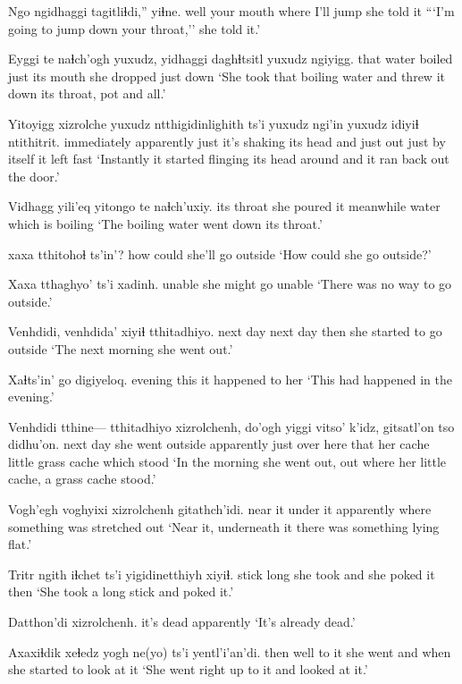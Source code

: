 \documentclass[12pt]{article}
\begin{document}
\gll Ngo ngidhaggi tagitliɬdi,'' yiɬne.
well {your mouth} {where I'll jump} {she told it}
\glt ```I'm going to jump down your throat,'' she told it.'
\glend

\gll Eyggi te naɬch'ogh yuxudz, yidhaggi daghɬtsitl yuxudz ngiyigg.
that water boiled just {its mouth} {she dropped} just down
\glt `She took that boiling water and threw it down its throat, pot and all.'
\glend

\gll Yitoyigg xizrolche yuxudz ntthigidinlighith ts'i yuxudz ngi'in yuxudz idiyiɬ ntithitrit.
immediately apparently just {it's shaking its head} and just out just {by itself} {it left fast}
\glt `Instantly it started flinging its head around and it ran back out the door.'
\glend

\gll Vidhagg yili'eq yitongo te naɬch'uxiy.
{its throat} {she poured it} meanwhile water {which is boiling}
\glt `The boiling water went down its throat.'
\glend

 xaxa tthitohoɬ ts'in'? 
how could {she'll go outside} {}
\glt `How could she go outside?'
\glend

\gll Xaxa tthaghyo' ts'i xadinh.
unable {she might go} {} unable
\glt `There was no way to go outside.'
\glend

\gll Venhdidi, venhdida' xiyiɬ tthitadhiyo.
{next day} {next day} then {she started to go outside}
\glt `The next morning she went out.'
\glend

\gll Xaɬts'in' go digiyeloq.
evening this {it happened to her}
\glt `This had happened in the evening.'
\glend

\gll Venhdidi tthine--- tthitadhiyo xizrolchenh, do'ogh yiggi vitso' k'idz, {gitsatl'on tso} didhu'on.
{next day} {} {she went outside} apparently {just over here} that {her cache} little {grass cache} {which stood}
\glt `In the morning she went out, out where her little cache, a grass cache stood.'
\glend

\gll Vogh'egh voghyixi xizrolchenh gitathch'idi.
{near it} {under it} apparently {where something was stretched out}
\glt `Near it, underneath it there was something lying flat.'
\glend

\gll Tritr ngith iɬchet ts'i yigidinetthiyh xiyiɬ. 
stick long {she took} and {she poked it} then 
\glt `She took a long stick and poked it.'
\glend

\gll Datthon'di xizrolchenh.
{it's dead} apparently
\glt `It's already dead.'
\glend

\gll Axaxiɬdik xeɬedz yogh ne(yo) ts'i yentl'i'an'di. 
then well {to it} {she went} and {when she started to look at it}
\glt `She went right up to it and looked at it.'
\glend
\end{document}
